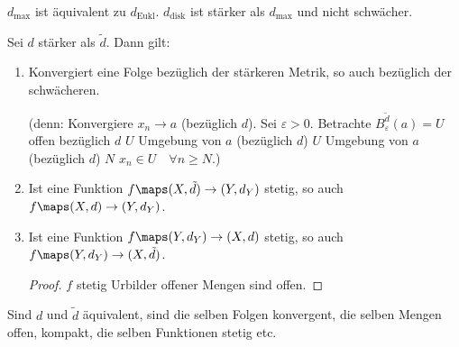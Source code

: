 \begin{beispiel*}
    \( d_{\max} \) ist äquivalent zu \( d_{\text{Eukl}} \). \( d_{\text{disk}} \) ist stärker als \( d_{\max}  \) und nicht schwächer.
\end{beispiel*}
\begin{bemerkungen}
    Sei \( d \) stärker als \( \tilde{d} \). Dann gilt:
    \begin{enumerate}
        \item Konvergiert eine Folge bezüglich der stärkeren Metrik, so auch bezüglich der schwächeren.
        
        (denn: Konvergiere \( x_n\to a \) (bezüglich \( d \)). Sei \( \varepsilon>0 \). Betrachte \( B_{\varepsilon}^{\tilde{d}}(a)=U \) offen bezüglich \( d \) \timplies \( U \) Umgebung von \( a \) (bezüglich \( d \)) \timplies \( U \) Umgebung von \( a \) (bezüglich \( d \)) \timplies \texists  \( N \) \sd \( x_n\in U\quad \forall n\geq N \).)
        
        \item Ist eine Funktion \( f\maps (X,\tilde{d})\to (Y,d_Y) \) stetig, so auch \( f\maps (X,d)\to (Y,d_Y) \).
        \item Ist eine Funktion \( f\maps (Y,d_Y)\to (X,d) \) stetig, so auch \( f\maps (Y,d_Y)\to (X,\tilde{d}) \).
        
        \begin{proof}
            \( f \) stetig \tiff Urbilder offener Mengen sind offen.
            
        \end{proof}
        
    \end{enumerate}
\end{bemerkungen}
\begin{bemerkung*}
    Sind \( d \) und \( \tilde{d} \) äquivalent, sind die selben Folgen konvergent, die selben Mengen offen, kompakt, die selben Funktionen stetig etc.
\end{bemerkung*}
